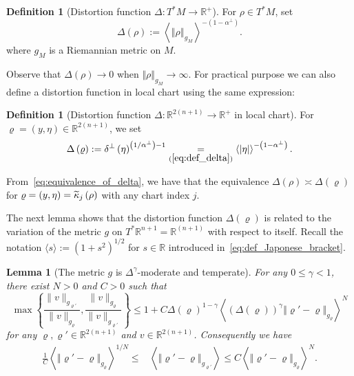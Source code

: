 \documentclass[10pt]{amsart}
\newtheorem{lemm}[theo]{Lemma}\newtheorem{prop}[theo]{Proposition}\newtheorem{coro}[theo]{Corollary}\newtheorem{conj}[theo]{Conjecture}
\theoremstyle{definition}\newtheorem{defi}[theo]{Definition}\newtheorem{rema}[theo]{Remark}\newtheorem{exam}[theo]{Example}\newtheorem{exem}[theo]{Example}\newtheorem{nota}[theo]{Notation}
\newcommand*\eq[1]{\underset{(#1)}{=}}
\newcommand{\bbR}{\mathbb{R}}
\let\oldtilde\tilde
\renewcommand*{\tilde}[1]{\mathchoice{\widetilde{#1}}{\widetilde{#1}}{\oldtilde{#1}}{\oldtilde{#1}}}
\begin{document}
\begin{cBoxA}{}
\begin{defi}[Distortion function $\Delta:T^{*}M\rightarrow\bbR^{+}$]
For $\rho\in T^{*}M$, set
\begin{equation}\label{eq:def_distortion_function_D}
\Delta\left(\rho\right):=\left\langle \left\Vert \rho\right\Vert _{g_{M}}\right\rangle ^{-\left(1-\alpha^{\perp}\right)}.
\end{equation}
where $g_{M}$ is a Riemannian metric on $M$.
\end{defi}
\end{cBoxA}

Observe that $\Delta(\rho)\rightarrow0$ when $\Vert \rho\Vert _{g_{M}}\rightarrow\infty$. For practical purpose we can also define a distortion function in local chart using the same expression:


\begin{defi}[Distortion function $\Delta:\bbR^{2(n+1)}\rightarrow\bbR^{+}$
in local chart] For $\varrho=(y,\eta)\in\bbR^{2(n+1)}$, we set
\begin{equation}\label{eq:def_distortion_function_D-1}
\Delta\left(\varrho\right):=\delta^{\perp}\left(\eta\right)^{\left(1/\alpha^{\perp}\right)-1}\eq{\ref{eq:def_delta}}\left\langle \left|\eta\right|\right\rangle ^{-\left(1-\alpha^{\perp}\right)}.
\end{equation}

From~\eqref{eq:equivalence_of_delta}, we have that the equivalence $\Delta(\rho)\asymp\Delta(\varrho)$ for $\varrho=(y,\eta)=\tilde{\kappa}_{j}\left(\rho\right)$ with any chart index $j$.
\end{defi}

The next lemma shows that the distortion function $\Delta(\varrho)$ is related to the variation of the metric $g$ on $T^{*}\bbR^{n+1}=\bbR^{(n+1)}$ with respect to itself. Recall the notation $\langle s\rangle :=(1+s^{2})^{1/2}$ for $s\in\bbR$ introduced in~\eqref{eq:def_Japonese_bracket}.

\begin{cBoxB}{}
\begin{lemm}[The metric $g$ is $\Delta^{\gamma}$-moderate and temperate]\label{lem:temperate_metric}
For any $0\leq\gamma<1$, there exist $N>0$ and $C>0$ such that
\begin{equation}\label{eq:g_moderate and temperate}
\max\left\{ \frac{\|v\|_{g_{\varrho'}}}{\|v\|_{g_{\varrho}}},\frac{\|v\|_{g_{\varrho}}}{\|v\|_{g_{\varrho'}}}\right\} \le1+C\Delta(\varrho)^{1-\gamma}\left\langle \left(\Delta\left(\varrho\right)\right)^{\gamma}\left\Vert \varrho'-\varrho\right\Vert _{g_{\varrho}}\right\rangle ^{N}
\end{equation}
for any $\varrho,\varrho'\in\bbR^{2(n+1)}$ and $v\in\bbR^{2(n+1)}$. Consequently we have
\begin{align}\label{eq:equivalence_distance}
\frac{1}{C}\left\langle \left\Vert \varrho'-\varrho\right\Vert _{g_{\varrho}}\right\rangle ^{1/N}\leq & \left\langle \left\Vert \varrho'-\varrho\right\Vert _{g_{\varrho'}}\right\rangle \le C\left\langle \left\Vert \varrho'-\varrho\right\Vert _{g_{\varrho}}\right\rangle ^{N}.
\end{align}
\end{lemm}
\end{cBoxB}
\end{document}

